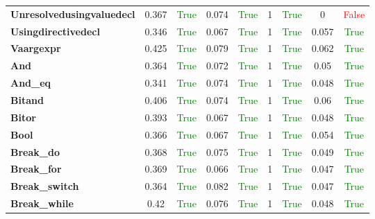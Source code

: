 \documentclass{article}
\begin{document}
\begin{xltabular}{\textwidth}{lcccccccc}
\textbf{{\fontsize{10}{12}\selectfont Unresolvedusingvaluedecl}}& 0.367&\textcolor{green}{True}& 0.074&\textcolor{green}{True}& 1&\textcolor{green}{True}& 0&\textcolor{red}{False} \\[0.5ex]
\textbf{{\fontsize{10}{12}\selectfont Usingdirectivedecl}}& 0.346&\textcolor{green}{True}& 0.067&\textcolor{green}{True}& 1&\textcolor{green}{True}& 0.057&\textcolor{green}{True} \\[0.5ex]
\textbf{{\fontsize{10}{12}\selectfont Vaargexpr}}& 0.425&\textcolor{green}{True}& 0.079&\textcolor{green}{True}& 1&\textcolor{green}{True}& 0.062&\textcolor{green}{True} \\[0.5ex]
\textbf{{\fontsize{10}{12}\selectfont And}}& 0.364&\textcolor{green}{True}& 0.072&\textcolor{green}{True}& 1&\textcolor{green}{True}& 0.05&\textcolor{green}{True} \\[0.5ex]
\textbf{{\fontsize{10}{12}\selectfont And\_eq}}& 0.341&\textcolor{green}{True}& 0.074&\textcolor{green}{True}& 1&\textcolor{green}{True}& 0.048&\textcolor{green}{True} \\[0.5ex]
\textbf{{\fontsize{10}{12}\selectfont Bitand}}& 0.406&\textcolor{green}{True}& 0.074&\textcolor{green}{True}& 1&\textcolor{green}{True}& 0.06&\textcolor{green}{True} \\[0.5ex]
\textbf{{\fontsize{10}{12}\selectfont Bitor}}& 0.393&\textcolor{green}{True}& 0.067&\textcolor{green}{True}& 1&\textcolor{green}{True}& 0.048&\textcolor{green}{True} \\[0.5ex]
\textbf{{\fontsize{10}{12}\selectfont Bool}}& 0.366&\textcolor{green}{True}& 0.067&\textcolor{green}{True}& 1&\textcolor{green}{True}& 0.054&\textcolor{green}{True} \\[0.5ex]
\textbf{{\fontsize{10}{12}\selectfont Break\_do}}& 0.368&\textcolor{green}{True}& 0.075&\textcolor{green}{True}& 1&\textcolor{green}{True}& 0.049&\textcolor{green}{True} \\[0.5ex]
\textbf{{\fontsize{10}{12}\selectfont Break\_for}}& 0.369&\textcolor{green}{True}& 0.066&\textcolor{green}{True}& 1&\textcolor{green}{True}& 0.047&\textcolor{green}{True} \\[0.5ex]
\textbf{{\fontsize{10}{12}\selectfont Break\_switch}}& 0.364&\textcolor{green}{True}& 0.082&\textcolor{green}{True}& 1&\textcolor{green}{True}& 0.047&\textcolor{green}{True} \\[0.5ex]
\textbf{{\fontsize{10}{12}\selectfont Break\_while}}& 0.42&\textcolor{green}{True}& 0.076&\textcolor{green}{True}& 1&\textcolor{green}{True}& 0.048&\textcolor{green}{True} \\[0.5ex]

\end{xltabular}
\end{document}
